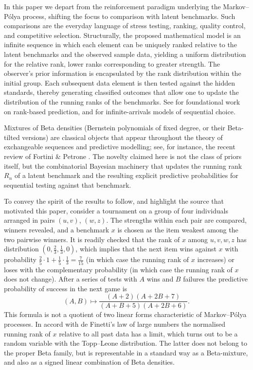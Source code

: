 \documentclass[11pt,reqno]{amsart}
\theoremstyle{definition}
\theoremstyle{remark}
\numberwithin{equation}{section}
\begin{document}
In this paper we depart from the reinforcement paradigm underlying the Markov--P\'olya process, shifting the focus to comparison with latent benchmarks. Such comparisons are the everyday language of stress testing, ranking, quality control, and competitive selection. Structurally, the proposed mathematical model is an infinite sequence in which each element can be uniquely ranked relative to the latent benchmarks and the observed sample data, yielding a uniform distribution for the relative rank, lower ranks corresponding to greater strength. The observer's prior information is encapsulated by the rank distribution within the initial group. Each subsequent data element is then tested against the hidden standards, thereby generating classified outcomes that allow one to update the distribution of the running ranks of the benchmarks. See \cite{Hill2009} for foundational work on rank-based prediction, and \cite{Samuels1991,Gnedin2004} for infinite-arrivals models of sequential choice.

Mixtures of Beta densities (Bernstein polynomials of fixed degree, or their Beta-tilted versions) are classical objects that appear throughout the theory of exchangeable sequences and predictive modelling; see, for instance, the recent review of Fortini \& Petrone \cite{FortiniPetrone2024}. The novelty claimed here is not the class of priors itself, but the combinatorial Bayesian machinery that updates the running rank \(R_n\) of a latent benchmark and the resulting explicit predictive probabilities for sequential testing against that benchmark.

To convey the spirit of the results to follow, and highlight the source that motivated this paper, consider a tournament on a group of four individuals arranged in pairs \((u,v)\), \((w,z)\). The strengths within each pair are compared, winners revealed, and a benchmark \(x\) is chosen as the item weakest among the two pairwise winners. It is readily checked that the rank of \(x\) among \(u,v,w,z\) has distribution \((0,\tfrac23,\tfrac13,0)\), which implies that the next item wins against \(x\) with probability \(\tfrac25\cdot1+\tfrac15\cdot\tfrac13=\tfrac7{15}\) (in which case the running rank of \(x\) increases) or loses with the complementary probability (in which case the running rank of \(x\) does not change). After a series of tests with \(A\) wins and \(B\) failures the predictive probability of success in the next game is
\[
(A,B)\mapsto\frac{(A+2)(A+2B+7)}{(A+B+5)(A+2B+6)}.
\]
This formula is not a quotient of two linear forms characteristic of Markov--P\'olya processes. In accord with de Finetti's law of large numbers the normalised running rank of \(x\) relative to all past data has a limit, which turns out to be a random variable with the Topp--Leone distribution. The latter does not belong to the proper Beta family, but is representable in a standard way as a Beta-mixture, and also as a signed linear combination of Beta densities.
\end{document}
